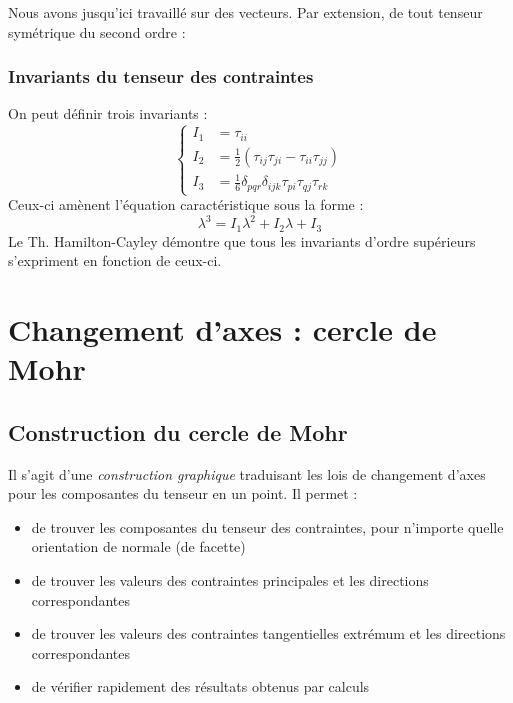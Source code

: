 Nous avons jusqu'ici travaillé sur des vecteurs. Par extension, de tout tenseur symétrique du second
ordre :\\
    
    
\subsubsection{Invariants du tenseur des contraintes}
On peut définir trois invariants :
\begin{equation}
	\left\{\begin{array}{ll}
	I_1 &= \tau_{ii} \\
	I_2 &= \frac{1}{2} (\tau_{ij}\tau_{ji} - \tau_{ii}\tau_{jj})\\
	I_3 &= \frac{1}{6}\delta_{pqr}\delta_{ijk}\tau_{pi}\tau_{qj}\tau_{rk}
	\end{array}\right.
\end{equation}
Ceux-ci amènent l'équation caractéristique sous la forme :
\begin{equation}
	\lambda^3 = I_1 \lambda^2 + I_2 \lambda + I_3
\end{equation}
Le Th. Hamilton-Cayley démontre que tous les invariants d'ordre supérieurs s'expriment en fonction
de ceux-ci.
    

\section{Changement d'axes : cercle de Mohr}
\subsection{Construction du cercle de Mohr}
Il s'agit d'une \textit{construction graphique} traduisant les lois de changement d'axes pour les 
composantes du tenseur en un point. Il permet :
\begin{itemize}
	\item de trouver les composantes du tenseur des contraintes, pour n'importe quelle orientation de
	      normale (de facette)
	\item de trouver les valeurs des contraintes principales et les  directions correspondantes
	\item de trouver les valeurs des contraintes tangentielles extrémum et les directions 
	      correspondantes
	\item de vérifier rapidement des résultats obtenus par calculs
\end{itemize}
    
